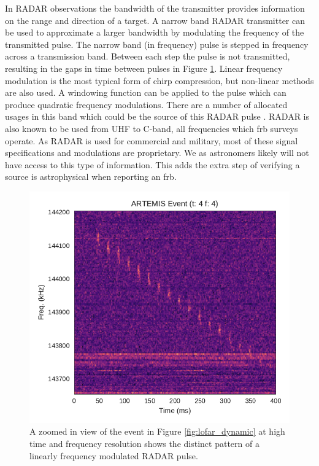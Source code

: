 \documentclass[a4paper,fleqn,usenatbib]{mnras}
\begin{document}
In RADAR observations the bandwidth of the transmitter provides information on
the range and direction of a target. A narrow band RADAR transmitter can be used
to approximate a larger bandwidth by modulating the frequency of the transmitted
pulse. The narrow band (in frequency) pulse is stepped in frequency across a
transmission band. Between each step the pulse is not transmitted, resulting in
the gaps in time between pulses in Figure \ref{fig:lofar_dynamic_high}. Linear
frequency modulation is the most typical form of chirp compression, but
non-linear methods are also used. A windowing function can be applied to the
pulse which can produce quadratic frequency modulations.  There are a number of
allocated usages in this band which could be the source of this RADAR pulse
\citep{ofcom2017}. RADAR is also known to be used from UHF to C-band, all
frequencies which \gls{frb} surveys operate. As RADAR is used for commercial and
military, most of these signal specifications and modulations are proprietary.
We as astronomers likely will not have access to this type of information.  This
adds the extra step of verifying a source is astrophysical when reporting an
\gls{frb}.

\begin{figure}
    \includegraphics[width=1.0\linewidth]{figures/LOFAR_dynamic_high_res.pdf}
    \caption{A zoomed in view of the event in Figure \ref{fig:lofar_dynamic} at
    high time and frequency resolution shows the distinct pattern of a linearly frequency
    modulated RADAR pulse.
    }
    \label{fig:lofar_dynamic_high}
\end{figure}
\end{document}
